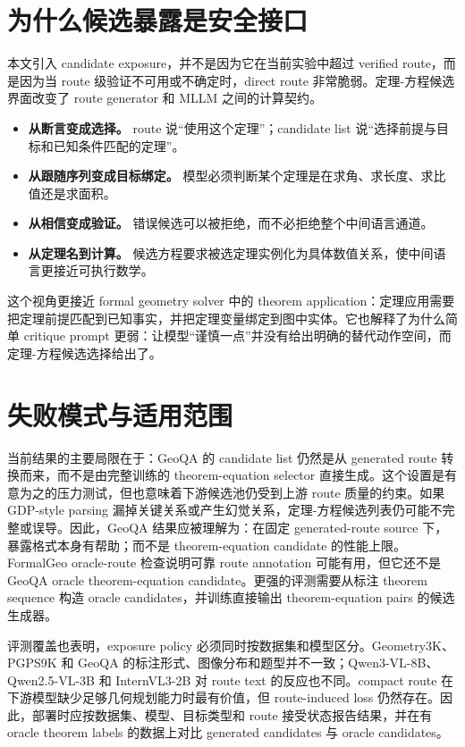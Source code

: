 \documentclass[UTF8,11pt,fontset=fandol]{ctexart}
\begin{document}
\section{为什么候选暴露是安全接口}
本文引入 candidate exposure，并不是因为它在当前实验中超过 verified route，而是因为当 route 级验证不可用或不确定时，direct route 非常脆弱。定理-方程候选界面改变了 route generator 和 MLLM 之间的计算契约。

\begin{itemize}[leftmargin=*]
\item \textbf{从断言变成选择。} route 说“使用这个定理”；candidate list 说“选择前提与目标和已知条件匹配的定理”。
\item \textbf{从跟随序列变成目标绑定。} 模型必须判断某个定理是在求角、求长度、求比值还是求面积。
\item \textbf{从相信变成验证。} 错误候选可以被拒绝，而不必拒绝整个中间语言通道。
\item \textbf{从定理名到计算。} 候选方程要求被选定理实例化为具体数值关系，使中间语言更接近可执行数学。
\end{itemize}

这个视角更接近 formal geometry solver 中的 theorem application：定理应用需要把定理前提匹配到已知事实，并把定理变量绑定到图中实体。它也解释了为什么简单 critique prompt 更弱：让模型“谨慎一点”并没有给出明确的替代动作空间，而定理-方程候选选择给出了。

\section{失败模式与适用范围}
当前结果的主要局限在于：GeoQA 的 candidate list 仍然是从 generated route 转换而来，而不是由完整训练的 theorem-equation selector 直接生成。这个设置是有意为之的压力测试，但也意味着下游候选池仍受到上游 route 质量的约束。如果 GDP-style parsing 漏掉关键关系或产生幻觉关系，定理-方程候选列表仍可能不完整或误导。因此，GeoQA 结果应被理解为：在固定 generated-route source 下，暴露格式本身有帮助；而不是 theorem-equation candidate 的性能上限。FormalGeo oracle-route 检查说明可靠 route annotation 可能有用，但它还不是 GeoQA oracle theorem-equation candidate。更强的评测需要从标注 theorem sequence 构造 oracle candidates，并训练直接输出 theorem-equation pairs 的候选生成器。

评测覆盖也表明，exposure policy 必须同时按数据集和模型区分。Geometry3K、PGPS9K 和 GeoQA 的标注形式、图像分布和题型并不一致；Qwen3-VL-8B、Qwen2.5-VL-3B 和 InternVL3-2B 对 route text 的反应也不同。compact route 在下游模型缺少足够几何规划能力时最有价值，但 route-induced loss 仍然存在。因此，部署时应按数据集、模型、目标类型和 route 接受状态报告结果，并在有 oracle theorem labels 的数据上对比 generated candidates 与 oracle candidates。
\end{document}
